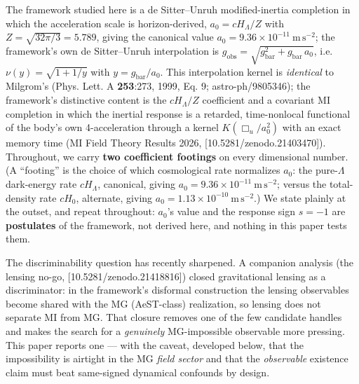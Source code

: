 \documentclass[
]{article}
\begin{document}
The framework studied here is a de Sitter--Unruh modified-inertia
completion in which the acceleration scale is horizon-derived,
\(a_0=cH_\Lambda/Z\) with \(Z=\sqrt{32\pi/3}=5.789\), giving the
canonical value \(a_0=9.36\times10^{-11}\ \mathrm{m\,s^{-2}}\); the
framework's own de Sitter--Unruh interpolation is
\(g_\mathrm{obs}=\sqrt{g_\mathrm{bar}^2+g_\mathrm{bar}\,a_0}\),
i.e.~\(\nu(y)=\sqrt{1+1/y}\) with \(y=g_\mathrm{bar}/a_0\). This
interpolation kernel is \emph{identical} to Milgrom's (Phys. Lett. A
\textbf{253}:273, 1999, Eq. 9; astro-ph/9805346); the framework's
distinctive content is the \(cH_\Lambda/Z\) coefficient and a covariant
MI completion in which the inertial response is a retarded,
time-nonlocal functional of the body's own 4-acceleration through a
kernel \(K(\Box_u/a_0^2)\) with an exact memory time (MI Field Theory
Results 2026, {[}10.5281/zenodo.21403470{]}). Throughout, we carry
\textbf{two coefficient footings} on every dimensional number. (A
``footing'' is the choice of which cosmological rate normalizes \(a_0\):
the pure-\(\Lambda\) dark-energy rate \(cH_\Lambda\), canonical, giving
\(a_0=9.36\times10^{-11}\ \mathrm{m\,s^{-2}}\); versus the total-density
rate \(cH_0\), alternate, giving
\(a_0=1.13\times10^{-10}\ \mathrm{m\,s^{-2}}\).) We state plainly at the
outset, and repeat throughout: \(a_0\)'s value and the response sign
\(s=-1\) are \textbf{postulates} of the framework, not derived here, and
nothing in this paper tests them.

The discriminability question has recently sharpened. A companion
analysis (the lensing no-go, {[}10.5281/zenodo.21418816{]}) closed
gravitational lensing as a discriminator: in the framework's disformal
construction the lensing observables become shared with the MG
(AeST-class) realization, so lensing does not separate MI from MG. That
closure removes one of the few candidate handles and makes the search
for a \emph{genuinely} MG-impossible observable more pressing. This
paper reports one --- with the caveat, developed below, that the
impossibility is airtight in the MG \emph{field sector} and that the
\emph{observable} existence claim must beat same-signed dynamical
confounds by design.
\end{document}
